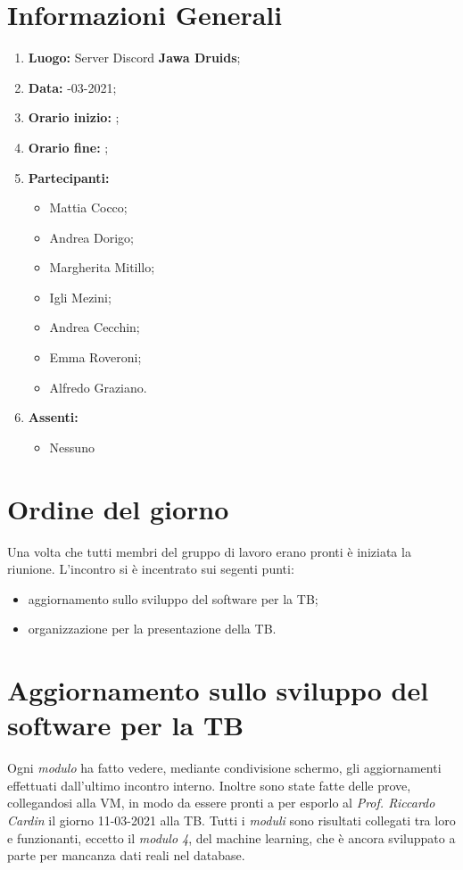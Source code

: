 \newpage
\section{Informazioni Generali}
\begin{enumerate}
  \item \textbf{Luogo:} \normalfont Server Discord \textbf{Jawa Druids};
  \item \textbf{Data:} -03-2021;
  \item \textbf{Orario inizio:} ;
  \item \textbf{Orario fine:} ;
  \item \textbf{Partecipanti:}
  \begin{itemize}
    \item Mattia Cocco;
    \item Andrea Dorigo;
    \item Margherita Mitillo;
    \item Igli Mezini;
    \item Andrea Cecchin;
    \item Emma Roveroni;
    \item Alfredo Graziano.
  \end{itemize}
  \item \textbf{Assenti:}
  \begin{itemize}
    \item Nessuno
  \end{itemize}
\end{enumerate}
\section{Ordine del giorno}
Una volta che tutti membri del gruppo di lavoro erano pronti è iniziata la riunione. L'incontro si è incentrato sui segenti punti:
\begin{itemize}
  \item aggiornamento sullo sviluppo del software per la TB;
  \item organizzazione per la presentazione della TB.
\end{itemize}

\section{Aggiornamento sullo sviluppo del software per la TB}
Ogni \textit{modulo} ha fatto vedere, mediante condivisione schermo, gli aggiornamenti effettuati dall'ultimo incontro interno.
Inoltre sono state fatte delle prove, collegandosi alla VM, in modo da essere pronti a per esporlo al \textit{Prof. Riccardo Cardin} il giorno 11-03-2021 alla TB.
Tutti i \textit{moduli} sono risultati collegati tra loro e funzionanti, eccetto il \textit{modulo 4}, del machine learning, che è ancora sviluppato a parte per mancanza dati reali nel database.


